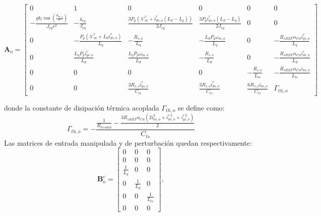 \documentclass[12pt, a4paper,journal, onecolumn, compsoc]{IEEEtran}
\begin{document}
\begin{equation*}
\bm{A}_o = \begin{bmatrix}
0 & 1 & 0 & 0 & 0 & 0 \\
-\frac{g k_l \cos\left(\frac{\theta_{m,o}}{r}\right)}{J_{eq} r^2} & -\frac{b_{eq}}{J_{eq}} & \frac{3 P_p (\lambda'^r_m + i^r_{ds,o} (L_d - L_q))}{2 J_{eq}} & \frac{3 P_p i^r_{qs,o} (L_d - L_q)}{2 J_{eq}} & 0 & 0 \\
0 & -\frac{P_p (\lambda'^r_m + L_d i^r_{ds,o})}{L_q} & -\frac{R_{s,o}}{L_q} & -\frac{L_d P_p \omega_{m,o}}{L_q} & 0 & -\frac{R_{sREF} \alpha_{Cu} i^r_{qs,o}}{L_q} \\
0 & \frac{L_q P_p i^r_{qs,o}}{L_d} & \frac{L_q P_p \omega_{m,o}}{L_d} & -\frac{R_{s,o}}{L_d} & 0 & -\frac{R_{sREF} \alpha_{Cu} i^r_{ds,o}}{L_d} \\
0 & 0 & 0 & 0 & -\frac{R_{s,o}}{L_{ls}} & -\frac{R_{sREF} \alpha_{Cu} i_{0s,o}}{L_{ls}} \\
0 & 0 & \frac{3 R_{s,o} i^r_{qs,o}}{C_{ts}} & \frac{3 R_{s,o} i^r_{ds,o}}{C_{ts}} & \frac{6 R_{s,o} i_{0s,o}}{C_{ts}} & \Gamma_{th,o}
\end{bmatrix}
\end{equation*}

donde la constante de disipación térmica acoplada $\Gamma_{th,o}$ se define como:
\begin{equation*}
\Gamma_{th,o} = -\frac{\frac{1}{R_{ts\text{-}amb}} - \frac{3 R_{sREF} \alpha_{Cu} (2 i_{0s,o}^2 + i^{r\,2}_{ds,o} + i^{r\,2}_{qs,o})}{2}}{C_{ts}}
\end{equation*}
Las matrices de entrada manipulada y de perturbación quedan respectivamente:
\begin{equation*}
\bm B_o^c = \begin{bmatrix}
0 & 0 & 0 \\
0 & 0 & 0 \\
\frac{1}{L_q} & 0 & 0 \\
0 & \frac{1}{L_d} & 0 \\
0 & 0 & \frac{1}{L_{ls}} \\
0 & 0 & 0
\end{bmatrix},
\end{equation*}
\end{document}
